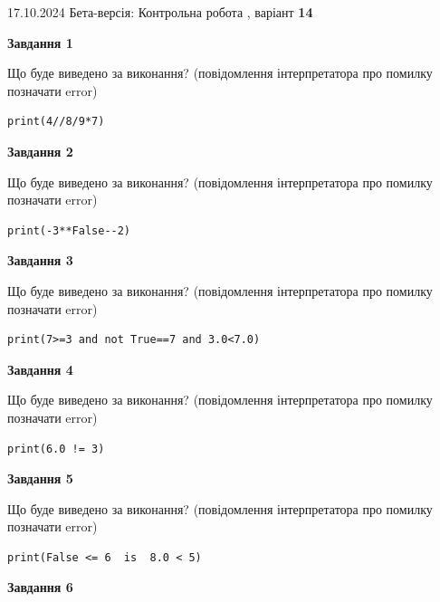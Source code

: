 \documentclass[12pt, ukrainian]{article}
\begin{document}
{\Large{17.10.2024 Бета-версія: Контрольна робота , варіант  \No \textbf { 14 }\par}}
{
\begin {large}
{\begin {center}\textbf{Завдання 1}\end {center}}

Що буде виведено за виконання? (повідомлення інтерпретатора про помилку позначати error)\par
\begin{verbatim}
print(4//8/9*7)
\end{verbatim}

{\begin {center}\textbf{Завдання 2}\end {center}}

Що буде виведено за виконання? (повідомлення інтерпретатора про помилку позначати error)\par
\begin{verbatim}
print(-3**False--2)
\end{verbatim}

{\begin {center}\textbf{Завдання 3}\end {center}}

Що буде виведено за виконання? (повідомлення інтерпретатора про помилку позначати error)\par
\begin{verbatim}
print(7>=3 and not True==7 and 3.0<7.0)
\end{verbatim}

{\begin {center}\textbf{Завдання 4}\end {center}}

Що буде виведено за виконання? (повідомлення інтерпретатора про помилку позначати error)\par
\begin{verbatim}
print(6.0 != 3)
\end{verbatim}

{\begin {center}\textbf{Завдання 5}\end {center}}

Що буде виведено за виконання? (повідомлення інтерпретатора про помилку позначати error)\par
\begin{verbatim}
print(False <= 6  is  8.0 < 5)
\end{verbatim}

{\begin {center}\textbf{Завдання 6}\end {center}}


\end{large}}
\end{document}

